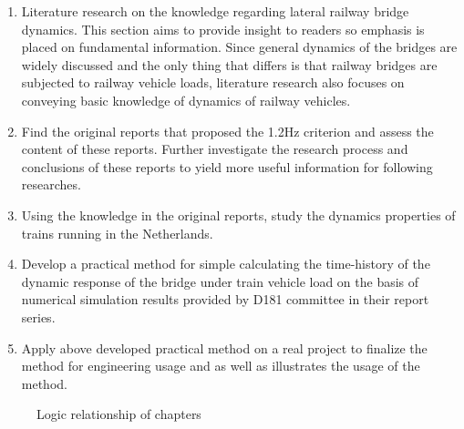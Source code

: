 \begin{enumerate}

\item Literature research on the knowledge regarding lateral railway bridge dynamics. This section aims to provide insight to readers so emphasis is placed on fundamental information. Since general dynamics of the bridges are widely discussed and the only thing that differs is that railway bridges are subjected to railway vehicle loads, literature research also focuses on conveying basic knowledge of dynamics of railway vehicles.

\item Find the original reports that proposed the 1.2Hz criterion and assess the content of these reports. Further investigate the research process and conclusions of these reports to yield more useful information for following researches.

\item Using the knowledge in the original reports, study the dynamics properties of trains running in the Netherlands.

\item Develop a practical method for simple calculating the time-history of the dynamic response of the bridge under train vehicle load on the basis of numerical simulation results provided by D181 committee in their report series.

\item Apply above developed practical method on a real project to finalize the method for engineering usage and as well as illustrates the usage of the method.

\end{enumerate}

\begin{figure}[h!]
\centering
{}
\caption{Logic relationship of chapters}
\label{fig:logicchpater}
\end{figure}

